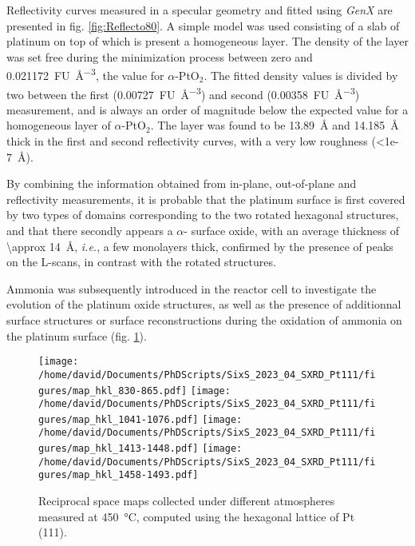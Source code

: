 Reflectivity curves measured in a specular geometry and fitted using \textit{GenX} are presented in fig. \ref{fig:Reflecto80}.
A simple model was used consisting of a slab of platinum on top of which is present a homogeneous layer.
The density of the layer was set free during the minimization process between zero and \qty{0.021172}{FU\per\cubic\angstrom}, the value for $\alpha$-PtO$_2$.
The fitted density values is divided by two between the first (\qty{0.00727}{FU\per\cubic\angstrom}) and second (\qty{0.00358}{FU\per\cubic\angstrom}) measurement, and is always an order of magnitude below the expected value for a homogeneous layer of $\alpha$-PtO$_2$.
The layer was found to be \qty{13.89}{\angstrom} and \qty{14.185}{\angstrom} thick in the first and second reflectivity curves, with a very low roughness (\qty{<1e-7}{\angstrom}).

By combining the information obtained from in-plane, out-of-plane and reflectivity measurements, it is probable that the platinum surface is first covered by two types of domains corresponding to the two rotated hexagonal structures, and that there secondly appears a $\alpha$- surface oxide, with an average thickness of \qty{\approx 14}{\angstrom}, \textit{i.e.}, a few monolayers thick, confirmed by the presence of peaks on the L-scans, in contrast with the rotated structures.


Ammonia was subsequently introduced in the reactor cell to investigate the evolution of the platinum oxide structures, as well as the presence of additionnal surface structures or surface reconstructions during the oxidation of ammonia on the platinum surface (fig. \ref{fig:MapsPt111B}).

\begin{figure}[!htb]
    \centering
    \texttt{[image: /home/david/Documents/PhDScripts/SixS\_2023\_04\_SXRD\_Pt111/figures/map\_hkl\_830-865.pdf]}
    \texttt{[image: /home/david/Documents/PhDScripts/SixS\_2023\_04\_SXRD\_Pt111/figures/map\_hkl\_1041-1076.pdf]}
    \texttt{[image: /home/david/Documents/PhDScripts/SixS\_2023\_04\_SXRD\_Pt111/figures/map\_hkl\_1413-1448.pdf]}
    \texttt{[image: /home/david/Documents/PhDScripts/SixS\_2023\_04\_SXRD\_Pt111/figures/map\_hkl\_1458-1493.pdf]}
    \caption{
        Reciprocal space maps collected under different atmospheres measured at \qty{450}{\degreeCelsius}, computed using the hexagonal lattice of Pt (111).
    }
    \label{fig:MapsPt111B}
\end{figure}

